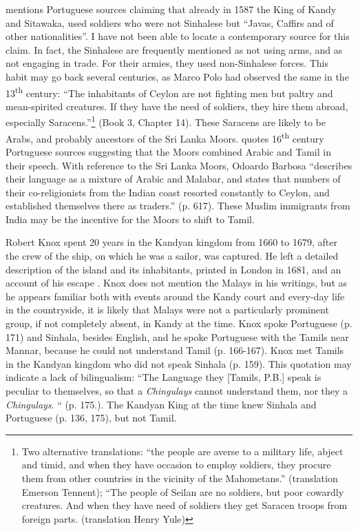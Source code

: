 \citet[26]{Powell1973} mentions Portuguese sources claiming that already in 1587 the King of Kandy and Sitawaka, used soldiers who were not Sinhalese but ``Javas, Caffirs and of other nationalities''. I have not been able to locate a contemporary source for this claim. In fact, the Sinhalese are frequently mentioned as not using arms, and as not engaging in trade. For their armies, they used non-Sinhalese forces. This habit may go back several centuries, as Marco Polo had observed the same in the 13\textsuperscript{th} century: ``The inhabitants of Ceylon are not fighting men but paltry and mean-spirited creatures. If they have the need of soldiers, they hire them abroad, especially Saracens.''\footnote{Two
 alternative translations: ``the people are averse to a military life, abject and timid, and when they have occasion to employ soldiers, they procure them from other countries in the vicinity of the Mahometans.'' (translation Emerson Tennent); ``The people of Seilan are no soldiers, but poor cowardly creatures. And when they have need of soldiers they get Saracen troops from foreign parts. (translation Henry Yule)
}
(Book 3, Chapter 14). These Saracens are likely to be Arabs, and probably ancestors of the Sri Lanka Moors. \citet{Tennent1859} quotes 16\textsuperscript{th} century Portuguese sources suggesting that the Moors combined Arabic and Tamil in their speech. With reference to the Sri Lanka Moors, Odoardo Barbosa ``describes their language as a mixture of Arabic and Malabar, and states that numbers of their co-religionists from the Indian coast resorted constantly to Ceylon, and established themselves there as traders.'' (p. 617). These Muslim immigrants from India may be the incentive for the Moors to shift to Tamil. 

Robert Knox spent 20 years in the Kandyan kingdom from 1660 to 1679, after the crew of the ship, on which he was a sailor, was captured. He left a detailed description of the island and its inhabitants, printed in London in 1681, and an account of his escape \citep{Winterbottom2009}. Knox does not mention the Malays in his writings, but as he appears familiar both with events around the Kandy court and every-day life in the countryside, it is likely that Malays were not a particularly prominent group, if not completely absent, in Kandy at the time. Knox spoke Portuguese (p. 171) and Sinhala, besides English, and he spoke Portuguese with the Tamils near Mannar, because he could not understand Tamil (p. 166-167). Knox met Tamils in the Kandyan kingdom who did not speak Sinhala (p. 159). This quotation may indicate a lack of bilingualism: ``The Language they [Tamils, P.B.] speak is peculiar to themselves, so that a \textit{Chingulays} cannot understand them, nor they a \textit{Chingulays}. `` (p. 175.). The Kandyan King at the time knew Sinhala and Portuguese (p. 136, 175), but not Tamil. 

